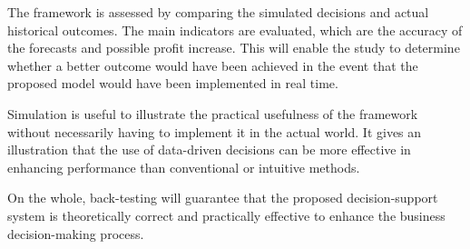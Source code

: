 The framework is assessed by comparing the simulated decisions and actual historical outcomes. The main indicators are evaluated, which are the accuracy of the forecasts and possible profit increase. This will enable the study to determine whether a better outcome would have been achieved in the event that the proposed model would have been implemented in real time. 

Simulation is useful to illustrate the practical usefulness of the framework without necessarily having to implement it in the actual world. It gives an illustration that the use of data-driven decisions can be more effective in enhancing performance than conventional or intuitive methods. 

On the whole, back-testing will guarantee that the proposed decision-support system is theoretically correct and practically effective to enhance the business decision-making process.